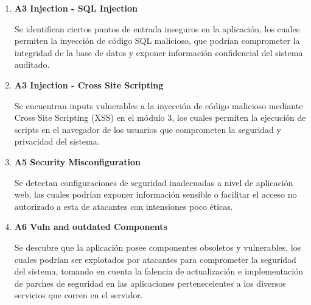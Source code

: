 \documentclass[12pt,oneside,a4paper]{book}
\begin{document}
\vspace{2em}

\begin{enumerate}
    \begin{enumerate}
        \item{\textbf{A3 Injection - SQL Injection}}

        \vspace{1em}

        \hspace{20pt}
            Se identifican ciertos puntos de entrada inseguros en la aplicación, los cuales permiten la inyección de código SQL malicioso, que podrían comprometer la integridad de la base de datos y exponer información confidencial del sistema auditado.
        
        \vspace{2em}
        
        \item{\textbf{A3 Injection - Cross Site Scripting}}

        \vspace{1em}

        \hspace{20pt}
        Se encuentran inputs vulnerables a la inyección de código malicioso mediante Cross Site Scripting (XSS) en el módulo 3, los cuales permiten la ejecución de scripts en el navegador de los usuarios que comprometen la seguridad y privacidad del sistema.
        
        \vspace{2em}
        
        \item{\textbf{A5 Security Misconfiguration}}

        \vspace{1em}

        \hspace{20pt}
        Se detectan configuraciones de seguridad inadecuadas a nivel de aplicación web, las cuales podrían exponer información sensible o facilitar el acceso no autorizado a esta de atacantes con intensiones poco éticas.

        \vspace{2em}
        
        \item{\textbf{A6 Vuln and outdated Components}}

        \vspace{1em}

        \hspace{20pt}
        Se descubre que la aplicación posee componentes obsoletos y vulnerables, los cuales podrían ser explotados por atacantes para comprometer la seguridad del sistema, tomando en cuenta la falencia de actualización e implementación de parches de seguridad en las aplicaciones perteneceientes a los diversos servicios que corren en el servidor.


\end{enumerate}
\end{enumerate}
\end{document}
